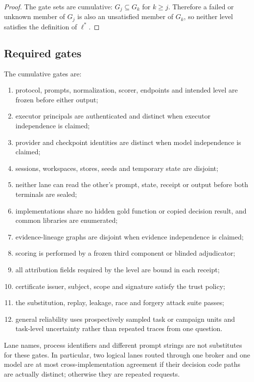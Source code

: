 \begin{proof}
The gate sets are cumulative: $G_j\subseteq G_k$ for $k\geq j$. Therefore a failed
or unknown member of $G_j$ is also an unsatisfied member of $G_k$, so neither level
satisfies the definition of $\ell^*$.
\end{proof}

\subsection{Required gates}

The cumulative gates are:

\begin{enumerate}[label=\textbf{G\arabic*.}]
  \item protocol, prompts, normalization, scorer, endpoints and intended level are
        frozen before either output;
  \item executor principals are authenticated and distinct when executor
        independence is claimed;
  \item provider and checkpoint identities are distinct when model independence
        is claimed;
  \item sessions, workspaces, stores, seeds and temporary state are disjoint;
  \item neither lane can read the other's prompt, state, receipt or output before
        both terminals are sealed;
  \item implementations share no hidden gold function or copied decision result,
        and common libraries are enumerated;
  \item evidence-lineage graphs are disjoint when evidence independence is claimed;
  \item scoring is performed by a frozen third component or blinded adjudicator;
  \item all attribution fields required by the level are bound in each receipt;
  \item certificate issuer, subject, scope and signature satisfy the trust policy;
  \item the substitution, replay, leakage, race and forgery attack suite passes;
  \item general reliability uses prospectively sampled task or campaign units and
        task-level uncertainty rather than repeated traces from one question.
\end{enumerate}

Lane names, process identifiers and different prompt strings are not substitutes
for these gates. In particular, two logical lanes routed through one broker and one
model are at most cross-implementation agreement if their decision code paths are
actually distinct; otherwise they are repeated requests.

